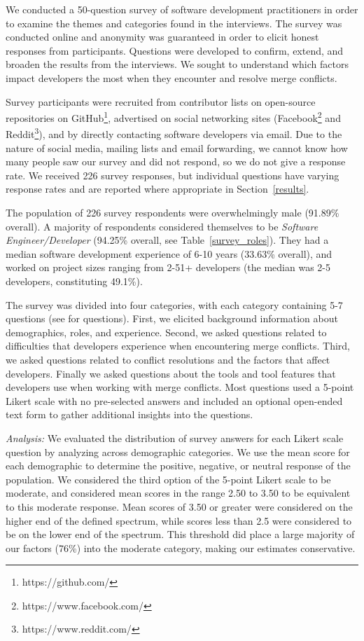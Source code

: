 We conducted a 50-question survey of software development practitioners in order to examine the themes and categories found in the interviews.
The survey was conducted online and anonymity was guaranteed in order to elicit honest responses from participants.
Questions were developed to confirm, extend, and broaden the results from the interviews.
We sought to understand which factors impact developers the most when they encounter and resolve merge conflicts.

Survey participants were recruited from contributor lists on open-source repositories on GitHub\footnote{https://github.com/}, advertised on social networking sites (Facebook\footnote{https://www.facebook.com/} and Reddit\footnote{https://www.reddit.com/}), and by directly contacting software developers via email. Due to the nature of social media, mailing lists and email forwarding, we cannot know how many people saw our survey and did not respond, so we do not give a response rate.
We received 226 survey responses, but individual questions have varying response rates and are reported where appropriate in Section~\ref{results}.

The population of 226 survey respondents were overwhelmingly male (91.89\% overall). A majority of respondents considered themselves to be \textit{Software Engineer/Developer} (94.25\% overall, see Table~\ref{survey_roles}). They had a median software development experience of 6-10 years (33.63\% overall), and worked on project sizes ranging from 2-51+ developers (the median was 2-5 developers, constituting 49.1\%).

The survey was divided into four categories, with each category containing 5-7 questions (see \cite{companion_site} for questions).
First, we elicited background information about demographics, roles, and experience.
Second, we asked questions related to difficulties that developers experience when encountering merge conflicts.
Third, we asked questions related to conflict resolutions and the factors that affect developers.
Finally we asked questions about the tools and tool features that developers use when working with merge conflicts.
Most questions used a 5-point Likert scale with no pre-selected answers and included an optional open-ended text form to gather additional insights into the questions. 

\textit{Analysis:} We evaluated the distribution of survey answers for each Likert scale question by analyzing across demographic categories. 
We use the mean score for each demographic to determine the positive, negative, or neutral response of the population. 
We considered the third option of the 5-point Likert scale to be moderate, and considered mean scores in the range 2.50 to 3.50 to be equivalent to this moderate response. Mean scores of 3.50 or greater were considered on the higher end of the defined spectrum, while scores less than 2.5 were considered to be on the lower end of the spectrum. This threshold did place a large majority of our factors (76\%) into the moderate category, making our estimates conservative.


